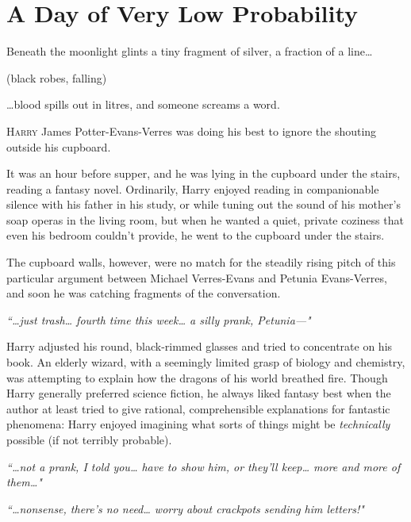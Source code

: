 \chapter{A Day of Very Low Probability}

\begin{chapterOpeningQuote}
\noindent
Beneath the moonlight glints a tiny fragment of silver, a fraction of a line{\ldots}

\vspace{2ex}
(black robes, falling)

\vspace{2ex}
{\ldots}blood spills out in litres, and someone screams a word.
\end{chapterOpeningQuote}

\lettrine{H}{arry} James Potter-Evans-Verres was doing his best to ignore the shouting outside his cupboard.

It was an hour before supper, and he was lying in the cupboard under the stairs, reading a fantasy novel. Ordinarily, Harry enjoyed reading in companionable silence with his father in his study, or while tuning out the sound of his mother's soap operas in the living room, but when he wanted a quiet, private coziness that even his bedroom couldn't provide, he went to the cupboard under the stairs.

The cupboard walls, however, were no match for the steadily rising pitch of this particular argument between Michael Verres-Evans and Petunia Evans-Verres, and soon he was catching fragments of the conversation.

\emph{``{\ldots}just trash{\ldots} fourth time this week{\ldots} a silly prank, Petunia---"}

Harry adjusted his round, black-rimmed glasses and tried to concentrate on his book. An elderly wizard, with a seemingly limited grasp of biology and chemistry, was attempting to explain how the dragons of his world breathed fire. Though Harry generally preferred science fiction, he always liked fantasy best when the author at least tried to give rational, comprehensible explanations for fantastic phenomena: Harry enjoyed imagining what sorts of things might be \emph{technically} possible (if not terribly probable).

\emph{``{\ldots}not a prank, I told you{\ldots} have to show him, or they'll keep{\ldots} more and more of them{\ldots}"}

\emph{``{\ldots}nonsense, there's no need{\ldots} worry about crackpots sending him letters!"}

